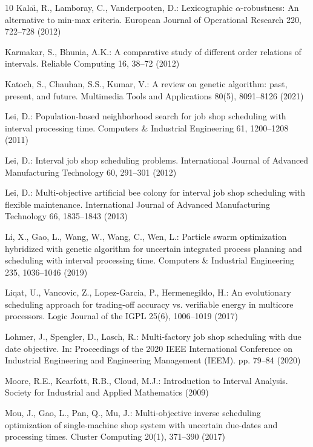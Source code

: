 \documentclass[12pt,halfline,a4paper]{ouparticle}
\begin{document}
\begin{thebibliography}{10}
Kala\"{\i}, R., Lamboray, C., Vanderpooten, D.: Lexicographic
  $\alpha$-robustness: An alternative to min-max criteria. European Journal of
  Operational Research  220,  722--728 (2012)

Karmakar, S., Bhunia, A.K.: A comparative study of different order relations of
  intervals. Reliable Computing  16,  38--72 (2012)

Katoch, S., Chauhan, S.S., Kumar, V.: A review on genetic algorithm: past,
  present, and future. Multimedia Tools and Applications  80(5),  8091--8126
  (2021)

Lei, D.: Population-based neighborhood search for job shop scheduling with
  interval processing time. Computers \& Industrial Engineering  61,
  1200--1208 (2011)

Lei, D.: Interval job shop scheduling problems. International Journal of
  Advanced Manufacturing Technology  60,  291--301 (2012)

Lei, D.: Multi-objective artificial bee colony for interval job shop scheduling
  with flexible maintenance. International Journal of Advanced Manufacturing
  Technology  66,  1835--1843 (2013)

Li, X., Gao, L., Wang, W., Wang, C., Wen, L.: Particle swarm optimization
  hybridized with genetic algorithm for uncertain integrated process planning
  and scheduling with interval processing time. Computers \& Industrial
  Engineering  235,  1036--1046 (2019)

Liqat, U., Vancovic, Z., Lopez-Garcia, P., Hermenegildo, H.: An evolutionary
  scheduling approach for trading-off accuracy vs. verifiable energy in
  multicore processors. Logic Journal of the IGPL  25(6),  1006--1019 (2017)

Lohmer, J., Spengler, D., Lasch, R.: Multi-factory job shop scheduling with due
  date objective. In: Proceedings of the 2020 IEEE International Conference on
  Industrial Engineering and Engineering Management (IEEM). pp. 79--84 (2020)

Moore, R.E., Kearfott, R.B., Cloud, M.J.: Introduction to Interval Analysis.
  Society for Industrial and Applied Mathematics (2009)

Mou, J., Gao, L., Pan, Q., Mu, J.: Multi-objective inverse scheduling
  optimization of single-machine shop system with uncertain due-dates and
  processing times. Cluster Computing  20(1),  371--390 (2017)


\end{thebibliography}
\end{document}
